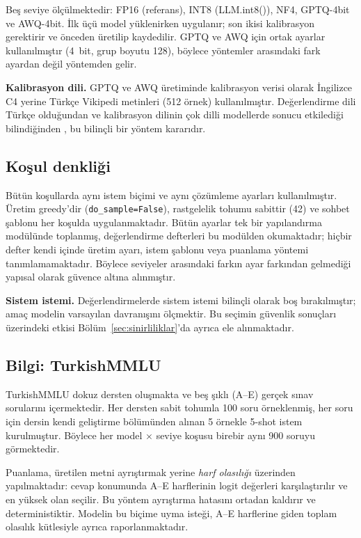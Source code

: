 \documentclass[conference]{IEEEtran}
\begin{document}
Beş seviye ölçülmektedir: FP16 (referans), INT8 (LLM.int8()), NF4, GPTQ-4bit ve
AWQ-4bit. İlk üçü model yüklenirken uygulanır; son ikisi kalibrasyon gerektirir
ve önceden üretilip kaydedilir. GPTQ ve AWQ için ortak ayarlar kullanılmıştır
(4~bit, grup boyutu 128), böylece yöntemler arasındaki fark ayardan değil
yöntemden gelir.

\textbf{Kalibrasyon dili.} GPTQ ve AWQ üretiminde kalibrasyon verisi olarak
İngilizce C4 yerine Türkçe Vikipedi metinleri (512 örnek) kullanılmıştır.
Değerlendirme dili Türkçe olduğundan ve kalibrasyon dilinin çok dilli
modellerde sonucu etkilediği bilindiğinden \cite{marchisio2024quantization},
bu bilinçli bir yöntem kararıdır.

\subsection{Koşul denkliği}

Bütün koşullarda aynı istem biçimi ve aynı çözümleme ayarları kullanılmıştır.
Üretim greedy'dir (\texttt{do\_sample=False}), rastgelelik tohumu sabittir
(42) ve sohbet şablonu her koşulda uygulanmaktadır. Bütün ayarlar tek bir
yapılandırma modülünde toplanmış, değerlendirme defterleri bu modülden
okumaktadır; hiçbir defter kendi içinde üretim ayarı, istem şablonu veya
puanlama yöntemi tanımlamamaktadır. Böylece seviyeler arasındaki farkın
ayar farkından gelmediği yapısal olarak güvence altına alınmıştır.

\textbf{Sistem istemi.} Değerlendirmelerde sistem istemi bilinçli olarak boş
bırakılmıştır; amaç modelin varsayılan davranışını ölçmektir. Bu seçimin
güvenlik sonuçları üzerindeki etkisi Bölüm~\ref{sec:sinirliliklar}'da ayrıca
ele alınmaktadır.

\subsection{Bilgi: TurkishMMLU}

TurkishMMLU \cite{yuksel2024turkishmmlu} dokuz dersten oluşmakta ve beş şıklı
(A--E) gerçek sınav sorularını içermektedir. Her dersten sabit tohumla 100 soru
örneklenmiş, her soru için dersin kendi geliştirme bölümünden alınan 5 örnekle
5-shot istem kurulmuştur. Böylece her model $\times$ seviye koşusu birebir aynı
900 soruyu görmektedir.

Puanlama, üretilen metni ayrıştırmak yerine \emph{harf olasılığı} üzerinden
yapılmaktadır: cevap konumunda A--E harflerinin logit değerleri karşılaştırılır
ve en yüksek olan seçilir. Bu yöntem ayrıştırma hatasını ortadan kaldırır ve
deterministiktir. Modelin bu biçime uyma isteği, A--E harflerine giden toplam
olasılık kütlesiyle ayrıca raporlanmaktadır.
\end{document}
